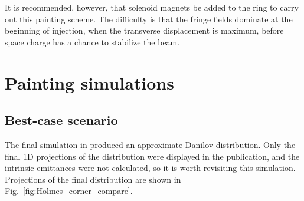 It is recommended, however, that solenoid magnets be added to the ring to carry out this painting scheme. The difficulty is that the fringe fields dominate at the beginning of injection, when the transverse displacement is maximum, before space charge has a chance to stabilize the beam.



\section{Painting simulations}


\subsection{Best-case scenario}

The final simulation in \cite{Holmes2018} produced an approximate Danilov distribution. Only the final 1D projections of the distribution were displayed in the publication, and the intrinsic emittances were not calculated, so it is worth revisiting this simulation. Projections of the final distribution are shown in Fig.~\ref{fig:Holmes_corner_compare}.
%
